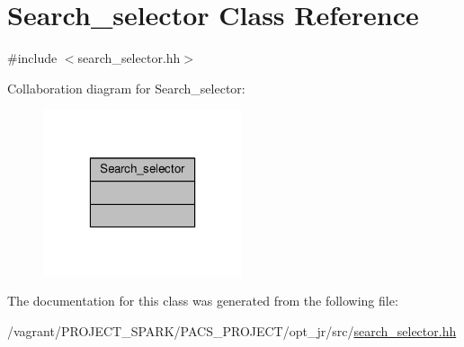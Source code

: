 \hypertarget{classSearch__selector}{\section{Search\-\_\-selector Class Reference}
\label{classSearch__selector}
}


{\ttfamily \#include $<$search\-\_\-selector.\-hh$>$}



Collaboration diagram for Search\-\_\-selector\-:
\nopagebreak
\begin{figure}[H]
\begin{center}
\leavevmode
\includegraphics[width=166pt]{classSearch__selector__coll__graph}
\end{center}
\end{figure}


The documentation for this class was generated from the following file\-:\begin{DoxyCompactItemize}
\item 
/vagrant/\-P\-R\-O\-J\-E\-C\-T\-\_\-\-S\-P\-A\-R\-K/\-P\-A\-C\-S\-\_\-\-P\-R\-O\-J\-E\-C\-T/opt\-\_\-jr/src/\hyperlink{search__selector_8hh}{search\-\_\-selector.\-hh}\end{DoxyCompactItemize}
